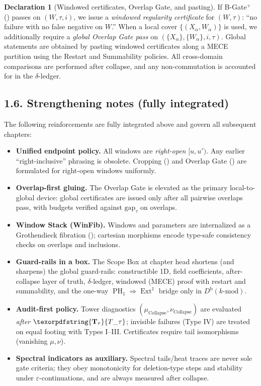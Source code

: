 \documentclass[11pt]{article}
\numberwithin{equation}{section}
\theoremstyle{plain}
\theoremstyle{definition}
\theoremstyle{remark}
\DeclareMathOperator{\Ext}{Ext}
\DeclareMathOperator{\PH}{PH}
\theoremstyle{plain}
\theoremstyle{definition}
\numberwithin{equation}{section}
\theoremstyle{definition}
\newtheorem{declaration}[theorem]{Declaration}
\DeclareRobustCommand{\Ttau}{\texorpdfstring{\ensuremath{\mathbf{T}_{\tau}}}{T\_\tau}}
\numberwithin{equation}{section}
\theoremstyle{plain}
\theoremstyle{definition}
\theoremstyle{remark}
\newcommand{\Dbk}{D^{\mathrm{b}}(k\text{-mod})}
\providecommand{\Tfun}[1]{\mathbf{T}_{#1}}
\providecommand{\Ttau}{\Tfun{\tau}}
\begin{document}
\begin{declaration}[Windowed certificates, Overlap Gate, and pasting]\label{dec:windowed-certificate}
If B-Gate\(^{+}\) () passes on \((W,\tau,i)\), we issue a \emph{windowed regularity certificate} for \((W,\tau)\): ``no failure with no false negative on \(W\).'' When a local cover \(\{(X_\alpha,W_\alpha)\}\) is used, we additionally require a \emph{global Overlap Gate pass} on \((\{X_\alpha\},\{W_\alpha\},i,\tau)\). Global statements are obtained by pasting windowed certificates along a MECE partition using the Restart and Summability policies. All cross-domain comparisons are performed after collapse, and any non-commutation is accounted for in the \(\delta\)-ledger.
\end{declaration}

\subsection*{1.6. Strengthening notes (fully integrated)}
The following reinforcements are fully integrated above and govern all subsequent chapters:

\begin{itemize}[leftmargin=1.25em]
  \item \textbf{Unified endpoint policy.} All windows are \emph{right-open} \([u,u')\). Any earlier ``right-inclusive'' phrasing is obsolete. Cropping () and Overlap Gate () are formulated for right-open windows uniformly.
  \item \textbf{Overlap-first gluing.} The Overlap Gate is elevated as the primary local-to-global device: global certificates are issued only after all pairwise overlaps pass, with budgets verified against \(\mathrm{gap}_\tau\) on overlaps.
  \item \textbf{Window Stack (WinFib).} Windows and parameters are internalized as a Grothendieck fibration (); cartesian morphisms encode type-safe consistency checks on overlaps and inclusions.
  \item \textbf{Guard-rails in a box.} The Scope Box at chapter head shortens (and sharpens) the global guard-rails: constructible 1D, field coefficients, after-collapse layer of truth, \(\delta\)-ledger, windowed (MECE) proof with restart and summability, and the one-way \(\PH_1\Rightarrow\Ext^1\) bridge only in \(\Dbk\).
  \item \textbf{Audit-first policy.} Tower diagnostics \((\mu_{\mathrm{Collapse}},\nu_{\mathrm{Collapse}})\) are evaluated \emph{after} \(\Ttau\); invisible failures (Type IV) are treated on equal footing with Types I–III. Certificates require tail isomorphisms (vanishing \(\mu,\nu\)).
  \item \textbf{Spectral indicators as auxiliary.} Spectral tails/heat traces are never sole gate criteria; they obey monotonicity for deletion-type steps and stability under \(\varepsilon\)-continuations, and are always measured after collapse.
\end{itemize}
\end{document}
